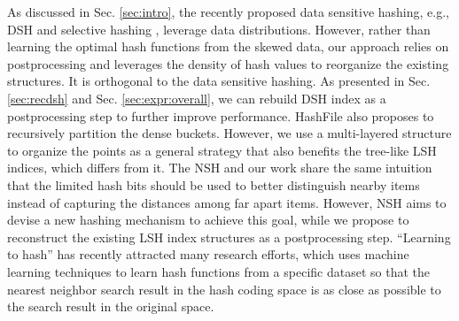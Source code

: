  As discussed in Sec. \ref{sec:intro}, the recently proposed data sensitive hashing, e.g., DSH \cite{Gao:2014:DDS:2588555.2588565} and selective hashing \cite{Gao:2015:SHC:2783258.2783284}, leverage data distributions. However, rather than learning the optimal hash functions from the skewed data, our approach relies on postprocessing and leverages the density of hash values to reorganize the existing structures. It is orthogonal to the data sensitive hashing. As presented in Sec. \ref{sec:recdsh} and Sec. \ref{sec:expr:overall}, we can rebuild DSH index as a postprocessing step to further improve performance. HashFile \cite{Zhang:2011:HEI:2004686.2005629} also proposes to recursively partition the dense buckets. However, we use a multi-layered structure to organize the points as a general strategy that also benefits the tree-like LSH indices, which differs from it. The NSH \cite{Park:2015:NH:2850583.2850589} and our work share the same intuition that the limited hash bits should be used to better distinguish nearby items instead of capturing the distances among far apart items. However, NSH aims to devise a new hashing mechanism to achieve this goal, while we propose to reconstruct the existing LSH index structures as a postprocessing step. ``Learning to hash'' \cite{7915742} has recently attracted many research efforts, which uses machine learning techniques to learn hash functions from a specific dataset so that the nearest neighbor search result in the hash coding space is as close as possible to the search result in the original space.






